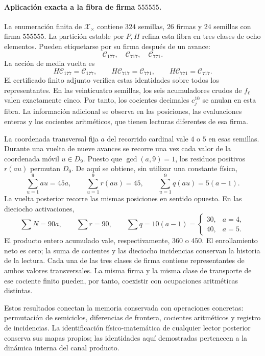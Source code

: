 \paragraph{Aplicación exacta a la fibra de firma \texorpdfstring{$555555$}{555555}.}

La enumeración finita de $\mathscr X_\times$ contiene $324$ semillas,
$26$ firmas y $24$ semillas con firma $555555$. La partición estable
por $P,H$ refina esta fibra en tres clases de ocho elementos. Pueden
etiquetarse por su firma después de un avance:
\[
 \mathscr C_{177},\quad\mathscr C_{717},\quad\mathscr C_{771}.
\]
La acción de media vuelta es
\[
 H\mathscr C_{177}=\mathscr C_{177},\qquad
 H\mathscr C_{717}=\mathscr C_{771},\qquad
 H\mathscr C_{771}=\mathscr C_{717}.
\]
El certificado finito adjunto verifica estas identidades sobre todos los
representantes. En las veinticuatro semillas, los seis acumuladores
crudos de $f_\ell$ valen exactamente cinco. Por tanto, los cocientes
decimales $c_j^{10}$ se anulan en esta fibra. La información adicional
se observa en las posiciones, las evaluaciones enteras y los cocientes
aritméticos, que tienen lecturas diferentes de esa firma.

La coordenada transversal fija $a$ del recorrido cardinal vale $4$ o
$5$ en esas semillas. Durante una vuelta de nueve avances se recorre
una vez cada valor de la coordenada móvil $u\in D_9$. Puesto que
$\gcd(a,9)=1$, los residuos positivos $r(au)$ permutan $D_9$.
De aquí se obtiene, sin utilizar una constante física,
\[
 \sum_{u=1}^9au=45a,\qquad
 \sum_{u=1}^9r(au)=45,\qquad
 \sum_{u=1}^9q(au)=5(a-1).
\]
La vuelta posterior recorre las mismas posiciones en sentido opuesto.
En las dieciocho activaciones,
\begin{equation}
 \sum N=90a,\qquad\sum r=90,\qquad
 \sum q=10(a-1)=
 \begin{cases}30,&a=4,\\40,&a=5.\end{cases}
 \label{bim09:ocupacion-30-40}
\end{equation}
El producto entero acumulado vale, respectivamente, $360$ o $450$.
El enrollamiento neto es cero; la suma de cocientes y las dieciocho
incidencias conservan la historia de la lectura. Cada una de las tres
clases de firma contiene representantes de ambos valores transversales.
La misma firma y la misma clase de transporte de ese cociente finito
pueden, por tanto, coexistir con ocupaciones aritméticas distintas.

Estos resultados conectan la memoria conservada con operaciones
concretas: permutación de semiciclos, diferencias de frontera,
cocientes aritméticos y registro de incidencias. La identificación
físico-matemática de cualquier lector posterior conserva sus mapas
propios; las identidades aquí demostradas pertenecen a la dinámica
interna del canal producto.
